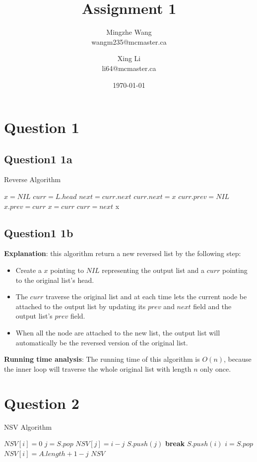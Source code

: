 \documentclass[11pt]{article}
\author{Mingzhe Wang\\wangm235@mcmaster.ca
\and Xing Li\\li64@mcmaster.ca}
\date{\today}
\title{Assignment 1}
\newcommand{\algorithmicbreak}{\textbf{break}}
\begin{document}
\maketitle
\tableofcontents

\newpage
\section{Question 1}
\label{q1}
\subsection{Question1 1a}
\label{q1a}
\begin{algorithm}
\caption{Reverse Algorithm}
\begin{algorithmic}[1]
\State $x = NIL$
\State $curr = L.head$
\State $next = curr.next$
\State $curr.next = x$
\State $curr.prev = NIL$
\State $x.prev = curr$
\EndIf
\State $x = curr$
\State $curr = next$
\EndWhile
\State \Return x
\EndProcedure
\end{algorithmic}
\end{algorithm}

\subsection{Question1 1b}
\label{q1b}
\textbf{Explanation}: this algorithm return a new reversed list by the following step:
\begin{itemize}
\item Create a $x$ pointing to $NIL$ representing the output list and a $curr$ pointing to the original list's head.
\item The $curr$ traverse the original list and at each time lets the current node be attached to the output list by updating its $prev$ and $next$ field and the output list's $prev$ field.
\item When all the node are attached to the new list, the output list will automatically be the reversed version of the original list.
\end{itemize}
\textbf{Running time analysis}: The running time of this algorithm is $O(n)$, because the inner loop will traverse the whole original list with length $n$ only once.

\newpage
\section{Question 2}
\label{q2}
\begin{algorithm}
\caption{NSV Algorithm}
\begin{algorithmic}[1]
		\State $NSV[i] = 0$
	\EndFor
			\State $j = S.pop$
				\State $NSV[j] = i - j$
			\Else
				\State $S.push(j)$
				\State \algorithmicbreak
			\EndIf
		\EndWhile
			\State $S.push(i)$
		\EndIf
	\EndFor
		\State $i = S.pop$
		\State $NSV[i] = A.length + 1 - j$
	\EndWhile
	\State \Return $NSV$
\EndProcedure
\end{algorithmic}
\end{algorithm}
\end{document}
